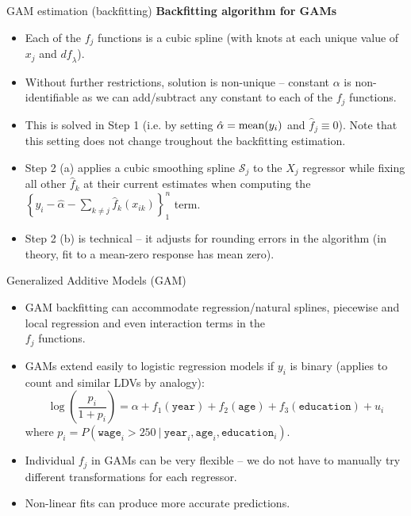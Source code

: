 \documentclass{beamer}
\begin{document}
\begin{frame}{GAM estimation (backfitting)}
\textbf{Backfitting algorithm for GAMs}\\ \medskip
\begin{itemize}
    \item Each of the $f_j$ functions is a cubic spline (with knots at each unique value of $x_j$ and $\textit{df}_{\lambda}$).
    \smallskip
    \item Without further restrictions, solution is non-unique -- constant $\alpha$ is non-identifiable as we can add/subtract any constant to each of the $f_j$ functions.
    \smallskip
    \item This is solved in Step 1 (i.e. by setting $\hat{\alpha} = \textnormal{mean}(y_i)$ and $\hat{f}_j \equiv 0 $). Note that this setting does not change troughout the backfitting estimation.
    \smallskip
    \item Step 2 (a) applies a cubic smoothing spline $\mathcal{S}_j$ to the $X_j$ regressor while fixing all other $\hat{f}_k$ at their current estimates when computing the $\left\lbrace y_i - \hat{\alpha} - \sum_{k \neq j} \hat{f}_k (x_{ik}) \right\rbrace_1^n$ term.
    \smallskip
    \item Step 2 (b) is technical -- it adjusts for rounding errors in the algorithm (in theory, fit to a mean-zero response has mean zero).
\end{itemize}
\end{frame}
\begin{frame}{Generalized Additive Models (GAM)}
\begin{itemize}
    \item[\ding{51}] GAM backfitting can accommodate regression/natural splines, piecewise and local regression and even interaction terms in the \\$f_j$ functions.
    \bigskip
    \item[\ding{51}] GAMs extend easily to logistic regression models if $y_i$ is binary (applies to count and similar LDVs by analogy):
    $$ \log \left( \frac{p_i}{1+p_i}
    \right) = \alpha + f_1(\texttt{year}) + f_2(\texttt{age}) + f_3(\texttt{education}) + u_i$$
where $p_i = P(\texttt{wage}_i > 250~|~ \texttt{year}_i, \texttt{age}_i, \texttt{education}_i)$.
\bigskip
\item[\ding{51}] Individual $f_j$ in GAMs can be very flexible -- we do not have to manually try different transformations for each regressor.
\bigskip
\item[\ding{51}] Non-linear fits can produce more accurate predictions.
\end{itemize}
\end{frame}
\end{document}
